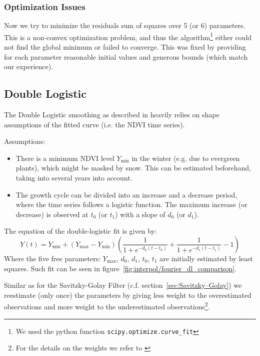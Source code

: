 \subsubsection*{Optimization Issues}
Now we try to minimize the residuals sum of squares over 5 (or 6) parameters. This is a non-convex optimization problem, and thus the algorithm\footnote{We used the python function \texttt{scipy.optimize.curve\_fit}} either could not find the global minimum or failed to converge. This was fixed by providing for each parameter reasonable initial values and generous bounds (which match our experience).

\subsection{Double Logistic}
\label{sec:double_logistic}
The Double Logistic smoothing as described in \cite{beckImprovedMonitoringVegetation2006} heavily relies on shape assumptions of the fitted curve (i.e. the NDVI time series).

Assumptions:
\begin{itemize}
  \item There is a minimum NDVI level $Y_{\min}$ in the winter (e.g. due to evergreen plants), which might be masked by snow. This can be estimated beforehand, taking into several years into account.
  \item The growth cycle can be divided into an increase and a decrease period, where the time series follows a logistic function. The maximum increase (or decrease) is observed at $t_0$ (or $t_1$) with a slope of $d_0$ (or $d_1$).
\end{itemize}

The equation of the double-logistic fit is given by:
\begin{equation*}
  Y(t) = Y_{\min} + \left(Y_{\max}-Y_{\min}\right)\left(\frac{1}{1+e^{-d_0(t-t_0)}}+\frac{1}{1+e^{-d_1(t-t_1)}}-1\right)
\end{equation*}
Where the five free parameters: $Y_{\max}$, $d_0$, $d_1$, $t_0$, $t_1$ are initially estimated by least squares. Such fit can be seen in figure~\ref{fig:interpol/fourier_dl_comparison}.

Similar as for the Savitzky-Golay Filter (c.f. section~\ref{sec:Savitzky–Golay}) we reestimate (only once) the parameters by giving less weight to the overestimated observations and more weight to the underestimated observations\footnote{For the details on the weights we refer to \cite{beckImprovedMonitoringVegetation2006}}.

